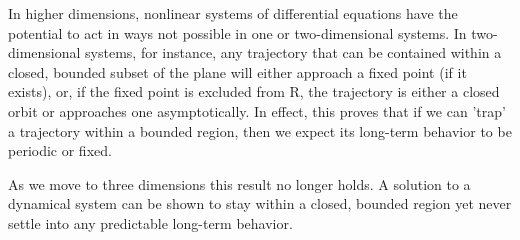 \documentclass{report}
\begin{document}
	In higher dimensions, nonlinear systems of differential equations have the potential to
	act in ways not possible in one or two-dimensional systems. In two-dimensional systems,
	for instance, any trajectory that can be contained within a closed, bounded subset of the
	plane will either approach a fixed point (if it exists), or, if the fixed point is
	excluded from R, the trajectory is either a closed orbit or approaches one asymptotically.
	In effect, this proves that if we can 'trap' a trajectory within a bounded region, then we
	expect its long-term behavior to be periodic or fixed.
	
	As we move to three dimensions this result no longer holds. A solution to a dynamical
	system can be shown to stay within a closed, bounded region yet never settle into any
	predictable long-term behavior.
\end{document}

